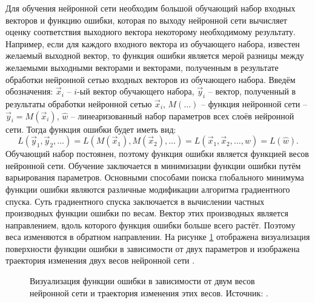 \par
Для обучения нейронной сети необходим большой обучающий набор входных векторов и функцию ошибки, которая по выходу нейронной сети вычисляет оценку соответствия выходного вектора некоторому необходимому результату. Например, если для каждого входного вектора из обучающего набора, известен желаемый выходной вектор, то функция ошибки является мерой разницы между желаемыми выходными векторами и векторами, полученным в результате обработки нейронной сетью входных векторов из обучающего набора. Введём обозначения: $\vec{x}_i$ -- $i$-ый вектор обучающего набора, $\vec{y}_i$ -- вектор, полученный в результаты обработки нейронной сетью $\vec{x}_i$, $M(\dots)$ -- функция нейронной сети -- $\vec{y}_i=M(\vec{x}_i)$, $\hat{w}$ -- линеаризованный набор параметров всех слоёв нейронной сети. Тогда функция ошибки будет иметь вид:
\begin{equation}\label{eq:loss1}
	L\left(\vec{y}_1,\vec{y}_2,\dots\right) = L\left(M(\vec{x}_1),M(\vec{x}_2),\dots\right) = L(\vec{x}_1,\vec{x}_2,\dots,\hat{w}) = L(\hat{w}).
\end{equation}
Обучающий набор постоянен, поэтому функция ошибки является функцией весов нейронной сети. Обучение заключается в минимизации функции ошибки путём варьирования параметров. Основными способами поиска глобального минимума функции ошибки являются различные модификации алгоритма градиентного спуска. Суть градиентного спуска заключается в вычислении частных производных функции ошибки по весам. Вектор этих производных является направлением, вдоль которого функция ошибки больше всего растёт. Поэтому веса изменяются в обратном направлении. На рисунке \ref{ris:SGD} отображена визуализация поверхности функции ошибки в зависимости от двух параметров и изображена траектория изменения двух весов нейронной сети \cite{amini2018spatial}.
\begin{figure}[h]
	\caption{Визуализация функции ошибки в зависимости от двум весов нейронной сети и траектория изменения этих весов. Источник: \cite{amini2018spatial}.}
	\label{ris:SGD}
\end{figure}
